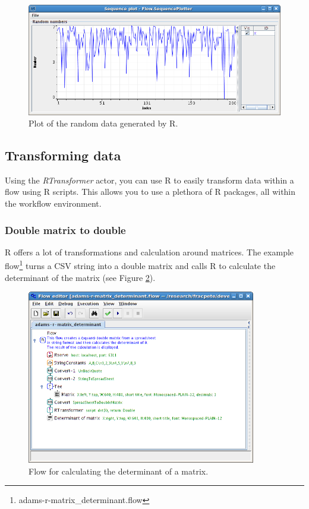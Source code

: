 \documentclass[a4paper]{book}
\begin{document}
\begin{figure}[ht]
	\centering
	\includegraphics[width=\textwidth]{images/source-output.png}
	\caption{Plot of the random data generated by R.}
	\label{source-output}
\end{figure}

\clearpage
\subsection{Transforming data}
Using the \textit{RTransformer} actor, you can use R to easily transform
data within a flow using R scripts. This allows you to use a plethora
of R packages, all within the workflow environment.

\subsubsection{Double matrix to double}
R offers a lot of transformations and calculation around matrices. The example
flow\footnote{adams-r-matrix\_determinant.flow} turns a CSV string into a
double matrix and calls R to calculate the determinant of the matrix (see
Figure \ref{matrix_determinant-flow}).
\begin{figure}[ht]
	\centering
	\includegraphics[width=10cm]{images/matrix_determinant-flow.png}
	\caption{Flow for calculating the determinant of a matrix.}
	\label{matrix_determinant-flow}
\end{figure}
\end{document}

